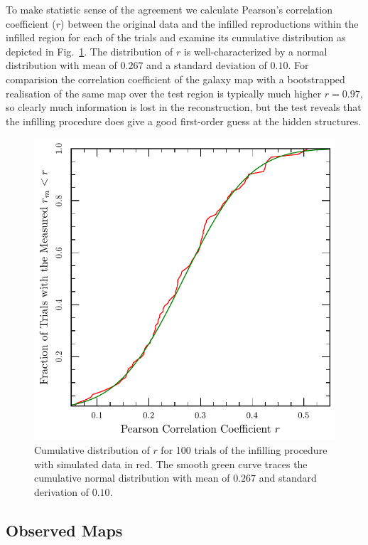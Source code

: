 \documentclass[useAMS,usenatbib]{mn2e}
\begin{document}
To make statistic sense of the agreement we calculate Pearson's
correlation coefficient ($r$) between the original data and the
infilled reproductions within the infilled region for each of the
trials and examine its cumulative distribution as depicted in
Fig.~\ref{fig:cleantest}.  The distribution of $r$ is
well-characterized by a normal distribution with mean of $0.267$ and a
standard deviation of $0.10$.  For comparision the correlation
coefficient of the galaxy map with a bootstrapped realisation of the
same map over the test region is typically much higher $r=0.97$, so
clearly much information is lost in the reconstruction, but the test
reveals that the infilling procedure does give a good first-order
guess at the hidden structures.
\begin{figure}
  \includegraphics[width=\columnwidth]{cleantest}
  \caption{Cumulative distribution of $r$ for 100 trials of the
    infilling procedure with simulated data in red.  The smooth green
    curve traces the cumulative normal distribution with mean of $0.267$
    and standard derivation of $0.10$.
  }
  \label{fig:cleantest}
\end{figure}

\subsection{Observed Maps}
\end{document}
